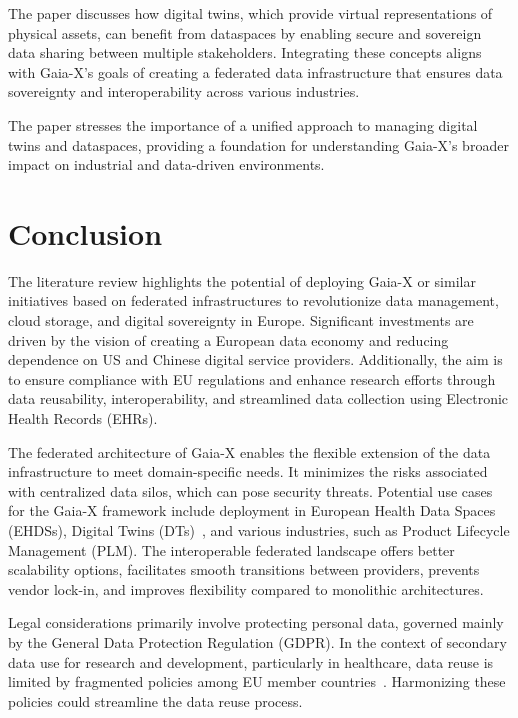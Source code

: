 The paper discusses how digital twins, which provide virtual representations of physical assets, can benefit from dataspaces by enabling secure and sovereign data sharing between multiple stakeholders.
Integrating these concepts aligns with Gaia-X's goals of creating a federated data infrastructure that ensures data sovereignty and interoperability across various industries.

The paper stresses the importance of a unified approach to managing digital twins and dataspaces, providing a foundation for understanding Gaia-X's broader impact on industrial and data-driven environments.

\section{Conclusion}\label{sec:conclusion}

The literature review highlights the potential of deploying Gaia-X or similar initiatives based on federated infrastructures to revolutionize data management, cloud storage, and digital sovereignty in Europe.
Significant investments are driven by the vision of creating a European data economy and reducing dependence on US and Chinese digital service providers.
Additionally, the aim is to ensure compliance with EU regulations and enhance research efforts through data reusability, interoperability, and streamlined data collection using Electronic Health Records (EHRs).

The federated architecture of Gaia-X enables the flexible extension of the data infrastructure to meet domain-specific needs.
It minimizes the risks associated with centralized data silos, which can pose security threats.
Potential use cases for the Gaia-X framework include deployment in European Health Data Spaces (EHDSs), Digital Twins (DTs)~\cite{digital_twins_and_data_spaces, role_of_digital_twins_in_data_spaces}, and various industries, such as Product Lifecycle Management (PLM).
The interoperable federated landscape offers better scalability options, facilitates smooth transitions between providers, prevents vendor lock-in, and improves flexibility compared to monolithic architectures.

Legal considerations primarily involve protecting personal data, governed mainly by the General Data Protection Regulation (GDPR).
In the context of secondary data use for research and development, particularly in healthcare, data reuse is limited by fragmented policies among EU member countries~\cite{legal_and_technological_aspects_of_ehds}.
Harmonizing these policies could streamline the data reuse process.

